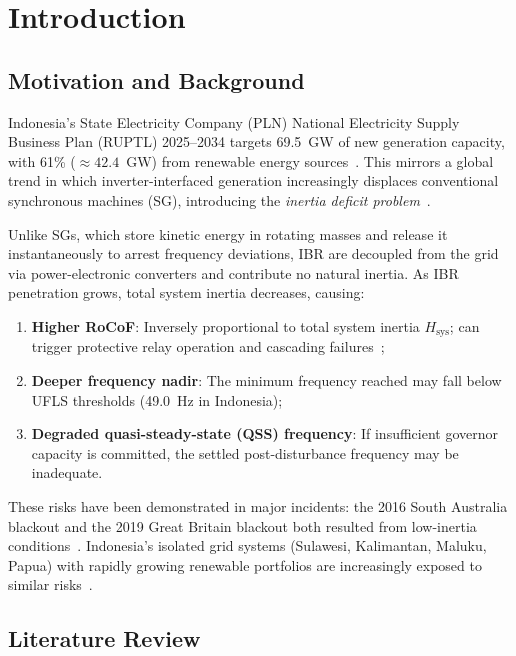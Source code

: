 \documentclass[journal]{IEEEtran}
\begin{document}
\section{Introduction}
\label{sec:intro}

\subsection{Motivation and Background}

Indonesia's State Electricity Company (PLN) National Electricity
Supply Business Plan (RUPTL) 2025--2034 targets 69.5~GW of new
generation capacity, with 61\% (${\approx}42.4$~GW) from renewable
energy sources~\cite{PLN2025}. This mirrors a global trend in which
inverter-interfaced generation increasingly displaces conventional
synchronous machines (SG), introducing the \emph{inertia deficit
problem}~\cite{Tielens2016}.

Unlike SGs, which store kinetic energy in rotating masses and
release it instantaneously to arrest frequency deviations, IBR
are decoupled from the grid via power-electronic converters and
contribute no natural inertia. As IBR penetration grows, total
system inertia decreases, causing:

\begin{enumerate}
  \item \textbf{Higher RoCoF}: Inversely proportional to total
    system inertia $H_{\text{sys}}$; can trigger protective relay
    operation and cascading failures~\cite{Tielens2016};
  \item \textbf{Deeper frequency nadir}: The minimum frequency
    reached may fall below UFLS thresholds (49.0~Hz in Indonesia);
  \item \textbf{Degraded quasi-steady-state (QSS) frequency}: If
    insufficient governor capacity is committed, the settled
    post-disturbance frequency may be inadequate.
\end{enumerate}

These risks have been demonstrated in major incidents: the 2016
South Australia blackout and the 2019 Great Britain blackout both
resulted from low-inertia conditions~\cite{AEMO2017}.
Indonesia's isolated grid systems (Sulawesi, Kalimantan, Maluku,
Papua) with rapidly growing renewable portfolios are increasingly
exposed to similar risks~\cite{E02Sulawesi,E03JAMALI}.

\subsection{Literature Review}
\end{document}

